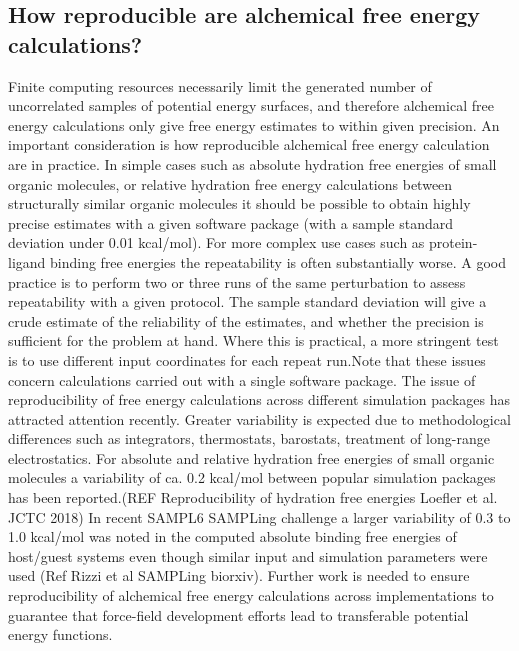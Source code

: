 \documentclass[9pt,bestpractices]{livecoms}
\begin{document}
\subsection*{How reproducible are alchemical free energy calculations?}

Finite computing resources necessarily limit the generated number of uncorrelated samples of potential energy surfaces, and therefore alchemical free energy calculations only give free energy estimates to within given precision. An important consideration is how reproducible alchemical free energy calculation are in practice. In simple cases such as absolute hydration free energies of small organic molecules, or relative hydration free energy calculations between structurally similar organic molecules it should be possible to obtain highly precise estimates with a given software package (with a sample standard deviation under 0.01 kcal/mol). For more complex use cases such as protein-ligand binding free energies the repeatability is often substantially worse. A good practice is to perform two or three runs of the same perturbation to assess repeatability with a given protocol. The sample standard deviation will give a crude estimate of the reliability of the estimates, and whether the precision is sufficient for the problem at hand. Where this is practical, a more stringent test is to use different input coordinates for each repeat run.Note that these issues concern calculations carried out with a single software package. The issue of reproducibility of free energy calculations across different simulation packages has attracted attention recently. Greater variability is expected due to methodological differences such as integrators, thermostats, barostats, treatment of long-range electrostatics. For absolute and relative hydration free energies of small organic molecules a variability of ca. 0.2 kcal/mol between popular simulation packages has been reported.(REF Reproducibility of hydration free energies Loefler et al.  JCTC 2018) In recent SAMPL6 SAMPLing challenge a larger variability of 0.3 to 1.0 kcal/mol was noted in the computed absolute binding free energies of host/guest systems even though similar input and simulation parameters were used (Ref Rizzi et al SAMPLing biorxiv). Further work is needed to ensure reproducibility of alchemical free energy calculations across implementations to guarantee that force-field development efforts lead to transferable potential energy functions. 
\end{document}
